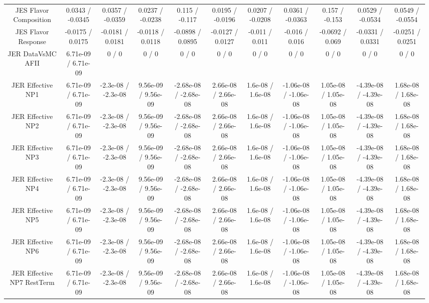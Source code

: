 \begin{table}[htbp]
\begin{center}
\begin{tabular}{|c|c|c|c|c|c|c|c|c|c|c|}
  JES Flavor Composition & 0.0343 / -0.0345 & 0.0357 / -0.0359 & 0.0237 / -0.0238 & 0.115 / -0.117 & 0.0195 / -0.0196 & 0.0207 / -0.0208 & 0.0361 / -0.0363 & 0.157 / -0.153 & 0.0529 / -0.0534 & 0.0549 / -0.0554 \\ 
  JES Flavor Response & -0.0175 / 0.0175 & -0.0181 / 0.0181 & -0.0118 / 0.0118 & -0.0898 / 0.0895 & -0.0127 / 0.0127 & -0.011 / 0.011 & -0.016 / 0.016 & -0.0692 / 0.069 & -0.0331 / 0.0331 & -0.0251 / 0.0251 \\ 
  JER DataVsMC AFII & 6.71e-09 / 6.71e-09 & 0 / 0 & 0 / 0 & 0 / 0 & 0 / 0 & 0 / 0 & 0 / 0 & 0 / 0 & 0 / 0 & 0 / 0 \\ 
  JER Effective NP1 & 6.71e-09 / 6.71e-09 & -2.3e-08 / -2.3e-08 & 9.56e-09 / 9.56e-09 & -2.68e-08 / -2.68e-08 & 2.66e-08 / 2.66e-08 & 1.6e-08 / 1.6e-08 & -1.06e-08 / -1.06e-08 & 1.05e-08 / 1.05e-08 & -4.39e-08 / -4.39e-08 & 1.68e-08 / 1.68e-08 \\ 
  JER Effective NP2 & 6.71e-09 / 6.71e-09 & -2.3e-08 / -2.3e-08 & 9.56e-09 / 9.56e-09 & -2.68e-08 / -2.68e-08 & 2.66e-08 / 2.66e-08 & 1.6e-08 / 1.6e-08 & -1.06e-08 / -1.06e-08 & 1.05e-08 / 1.05e-08 & -4.39e-08 / -4.39e-08 & 1.68e-08 / 1.68e-08 \\ 
  JER Effective NP3 & 6.71e-09 / 6.71e-09 & -2.3e-08 / -2.3e-08 & 9.56e-09 / 9.56e-09 & -2.68e-08 / -2.68e-08 & 2.66e-08 / 2.66e-08 & 1.6e-08 / 1.6e-08 & -1.06e-08 / -1.06e-08 & 1.05e-08 / 1.05e-08 & -4.39e-08 / -4.39e-08 & 1.68e-08 / 1.68e-08 \\ 
  JER Effective NP4 & 6.71e-09 / 6.71e-09 & -2.3e-08 / -2.3e-08 & 9.56e-09 / 9.56e-09 & -2.68e-08 / -2.68e-08 & 2.66e-08 / 2.66e-08 & 1.6e-08 / 1.6e-08 & -1.06e-08 / -1.06e-08 & 1.05e-08 / 1.05e-08 & -4.39e-08 / -4.39e-08 & 1.68e-08 / 1.68e-08 \\ 
  JER Effective NP5 & 6.71e-09 / 6.71e-09 & -2.3e-08 / -2.3e-08 & 9.56e-09 / 9.56e-09 & -2.68e-08 / -2.68e-08 & 2.66e-08 / 2.66e-08 & 1.6e-08 / 1.6e-08 & -1.06e-08 / -1.06e-08 & 1.05e-08 / 1.05e-08 & -4.39e-08 / -4.39e-08 & 1.68e-08 / 1.68e-08 \\ 
  JER Effective NP6 & 6.71e-09 / 6.71e-09 & -2.3e-08 / -2.3e-08 & 9.56e-09 / 9.56e-09 & -2.68e-08 / -2.68e-08 & 2.66e-08 / 2.66e-08 & 1.6e-08 / 1.6e-08 & -1.06e-08 / -1.06e-08 & 1.05e-08 / 1.05e-08 & -4.39e-08 / -4.39e-08 & 1.68e-08 / 1.68e-08 \\ 
  JER Effective NP7 RestTerm & 6.71e-09 / 6.71e-09 & -2.3e-08 / -2.3e-08 & 9.56e-09 / 9.56e-09 & -2.68e-08 / -2.68e-08 & 2.66e-08 / 2.66e-08 & 1.6e-08 / 1.6e-08 & -1.06e-08 / -1.06e-08 & 1.05e-08 / 1.05e-08 & -4.39e-08 / -4.39e-08 & 1.68e-08 / 1.68e-08 \\ 

\end{tabular}
\end{center}
\end{table}
